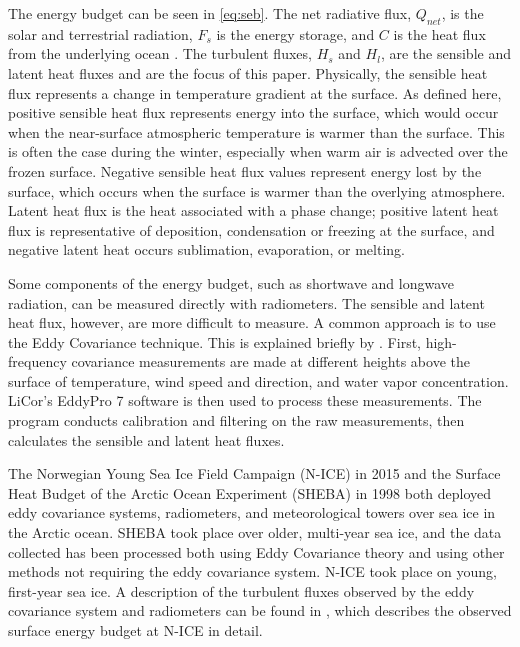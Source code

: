 The energy budget can be seen in \ref{eq:seb}. The net radiative flux, $Q_{net}$, is the solar and terrestrial radiation, $F_{s}$ is the energy storage, and $C$ is the heat flux from the underlying ocean \citep{walden:2017}. The turbulent fluxes, $H_{s}$ and $H_{l}$, are the sensible and latent heat fluxes and are the focus of this paper. Physically, the sensible heat flux represents a change in temperature gradient at the surface. As defined here, positive sensible heat flux represents energy into the surface, which would occur when the near-surface atmospheric temperature is warmer than the surface. This is often the case during the winter, especially when warm air is advected over the frozen surface. Negative sensible heat flux values represent energy lost by the surface, which occurs when the surface is warmer than the overlying atmosphere. Latent heat flux is the heat associated with a phase change; positive latent heat flux is representative of deposition, condensation or freezing at the surface, and negative latent heat occurs sublimation, evaporation, or melting.

Some components of the energy budget, such as shortwave and longwave radiation, can be measured directly with radiometers. The sensible and latent heat flux, however, are more difficult to measure. A common approach is to use the Eddy Covariance technique. This is explained briefly by \citet{walden:2017}. First, high-frequency covariance measurements are made at different heights above the surface of temperature, wind speed and direction, and water vapor concentration. LiCor's EddyPro 7 \citep{epro} software is then used to process these measurements. The program conducts calibration and filtering on the raw measurements, then calculates the sensible and latent heat fluxes. 

The Norwegian Young Sea Ice Field Campaign (N-ICE) in 2015 and the Surface Heat Budget of the Arctic Ocean Experiment (SHEBA) in 1998 both deployed eddy covariance systems, radiometers, and meteorological towers over sea ice in the Arctic ocean. SHEBA took place over older, multi-year sea ice, and the data collected has been processed both using Eddy Covariance theory and using other methods not requiring the eddy covariance system. N-ICE took place on young, first-year sea ice. A description of the turbulent fluxes observed by the eddy covariance system and radiometers can be found in \citet{walden:2017}, which describes the observed surface energy budget at N-ICE in detail. 


